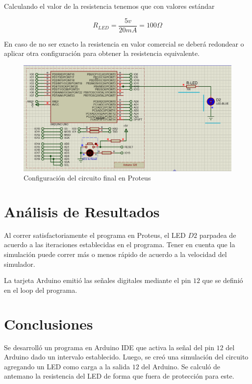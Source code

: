 \documentclass{article}
\begin{document}
\bigbreak

Calculando el valor de la resistencia tenemos que con valores estándar

$$
R_{LED} = \frac{5v}{20mA} = 100\Omega
$$

En caso de no ser exacto la resistencia en valor comercial se deberá redondear o aplicar otra configuración para obtener la resistencia equivalente.

\begin{figure}[H]
    \centering
    \includegraphics[width=0.5\paperwidth]{images/sim-2.png}
    \caption{Configuración del circuito final en Proteus}
\end{figure}

\section{Análisis de Resultados}

Al correr satisfactoriamente el programa en Proteus, el LED $D2$ parpadea de acuerdo a las iteraciones establecidas en el programa. Tener en cuenta que la simulación puede correr más o menos rápido de acuerdo a la velocidad del simulador.

\bigbreak

La tarjeta Arduino emitió las señales digitales mediante el pin $12$ que se definió en el loop del programa.

\section{Conclusiones}

Se desarrolló un programa en Arduino IDE que activa la señal del pin $12$ del Arduino dado un intervalo establecido. Luego, se creó una simulación del circuito agregando un LED como carga a la salida $12$ del Arduino. Se calculó de antemano la resistencia del LED de forma que fuera de protección para este.

\printbibliography
\end{document}
